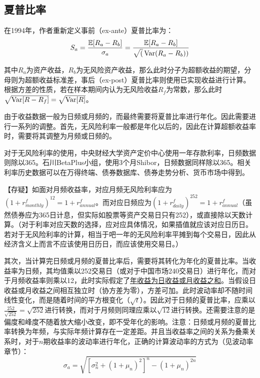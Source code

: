\documentclass[11pt]{article}
\begin{document}
\begin{appendices}

\section{夏普比率}

在1994年，作者重新定义事前（ex-ante）夏普比率为：
\begin{equation*}
    S_a = \frac{\mathbb{E}[R_a-R_b]}{\sigma_a} = \frac{\mathbb{E}[R_a-R_b]}{\sqrt(\operatorname{Var} (R_a - R_b))}
\end{equation*}

其中$R_a$为资产收益，$R_b$为无风险资产收益，那么此时分子为超额收益的期望，分母则为超额收益标准差，事后（ex-post）夏普比率则使用已实现收益进行计算。根据方差的性质，若在样本期间内认为无风险收益$R_f$为常数，那么此时$\sqrt{\operatorname{Var}[R-R_f]} = \sqrt{\operatorname{Var}[R]}$。

由于收益数据一般为日频或月频的，而最终需要将夏普比率进行年化。因此需要进行一系列的调整。首先，无风险利率一般都是年化以后的，因此在计算超额收益率时，需要将其调整为月频或日频的。

对于无风险利率的使用，中央财经大学资产定价中心使用一年存款利率，日频数据则除以365。石川BetaPlus小组，使用3个月Shibor，日频数据同样除以365。相关利率历史数据可以在万得终端、债券数据库、债券走势分析、货币市场中得到。

【存疑】如面对月频收益率，对应月频无风险利率应为$(1 + r_{monthly}^f)^{12} = 1 + r_{annual}^f$。而对应日频应为$(1 + r_{daily}^f)^{252} = 1 + r_{annual}^f$（虽然债券应为365日计息，但实际如股票等资产交易日只有252），或直接除以天数计算。（对于利率对应天数的选择，应对应具体情况，如果插值就应该对应日历日。若对于无风险利率的计算，相当于吧一年的无风险利率平摊到每个交易日，因此从经济含义上而言不应该使用日历日，而应该使用交易日。）

其次，当计算完日频或月频的夏普比率后，需要将其转化为年化的夏普比率。当收益率为日频，其均值乘以252交易日（或对于中国市场240交易日）进行年化，而对于月频收益率则乘以12，此时实际假定了\uline{年收益为日收益或月收益之和}。当假设日收益或月收益之间相互独立时（协方差为零），方差可加。此时波动率却不随时间线性变化，而是随着时间的平方根变化（$\sqrt{t}$）。因此对于日频的夏普比率，应乘以$\frac{252}{\sqrt{252}} = \sqrt{252}$进行转换，而对于月频则同理应乘以$\sqrt{12}$进行转换。还需要注意的是偏度和峰度不随着放大缩小改变，即不受年化的影响。注意：日频或月频的夏普比率转换为年频，与实际年频计算存在一定差距。并且当收益率之间的关系为叠乘关系时，对于$n$期收益率的波动率进行年化，正确的计算波动率的方式为（见波动率章节）：
\begin{equation*}
    \sigma_a = \sqrt{ \left[\sigma_n^2 + (1+\mu_n)^2\right]^{n} - (1+\mu_n)^{2n} }
\end{equation*}


\end{appendices}
\end{document}
